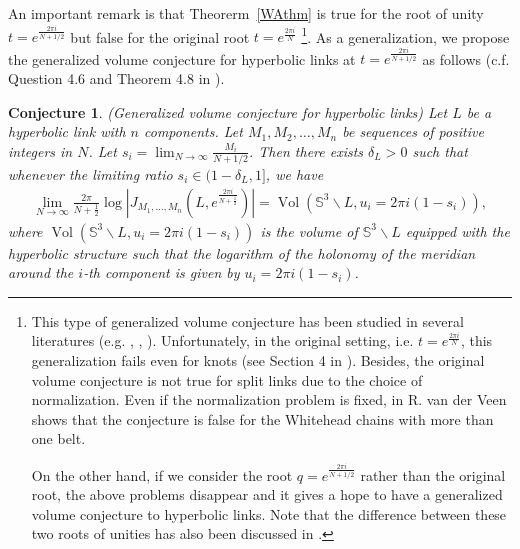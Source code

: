 \documentclass[10pt,a4paper]{article}
\newcommand{\ds}{\displaystyle}
\def\Vol{\operatorname{Vol}}
\newtheorem{conjecture}{Conjecture}
\def\SS{{\mathbb S}}
\def\Vol{\operatorname{Vol}}
\begin{document}
An important remark is that Theorerm~\ref{WAthm} is true for the root of unity $t=e^{\frac{2\pi i}{N+1/2}}$ but false for the original root $t=e^{\frac{2\pi i}{N}}$
\footnote{
This type of generalized volume conjecture has been studied in several literatures (e.g. \cite{GM08}, \cite{MY07}, \cite{HM13}). Unfortunately, in the original setting, i.e. $t=e^{\frac{2\pi i}{N}}$, this generalization fails even for knots (see Section 4 in \cite{C07}). Besides, the original volume conjecture is not true for split links due to the choice of normalization. Even if the normalization problem is fixed, in \cite{V08} R. van der Veen shows that the conjecture is false for the Whitehead chains with more than one belt.

On the other hand, if we consider the root $q=e^{\frac{2\pi i}{N+1/2}}$ rather than the original root, the above problems disappear and it gives a hope to have a generalized volume conjecture to hyperbolic links. Note that the difference between these two roots of unities has also been discussed in \cite{WA17}.}. As a generalization, we propose the generalized volume conjecture for hyperbolic
links at $t=e^{\frac{2\pi i}{N+1/2}}$ as follows (c.f. Question 4.6 and Theorem 4.8 in \cite{C07}).

\begin{conjecture}\label{GVCHL} (Generalized volume conjecture for hyperbolic links) Let $L$ be a hyperbolic link with $n$ components. Let $M_1, M_2, \dots , M_n$ be sequences of positive integers in $N$. Let $\ds s_i = \lim_{N\to\infty} \frac{M_i}{N+1/2}$. Then there exists $\delta_L > 0$ such that whenever the limiting ratio $s_i \in (1 - \delta_L, 1]$, we have
\begin{align*}
\lim_{N\to \infty} \frac{2\pi }{N+\frac{1}{2}} \log| J_{M_1,\dots,M_n}(L,e^{\frac{2\pi i}{N+\frac{1}{2}}})| = \Vol(\SS^3\backslash L, u_i = 2\pi i (1-s_i)),
\end{align*}
where $\Vol(\SS^3\backslash L, u_i = 2\pi i (1-s_i))$ is the volume of $\SS^3 \backslash L$ equipped with the hyperbolic structure such that the logarithm of the holonomy of the meridian around the $i$-th component is given by $u_i = 2\pi i(1 - s_i)$.
\end{conjecture}
\end{document}

